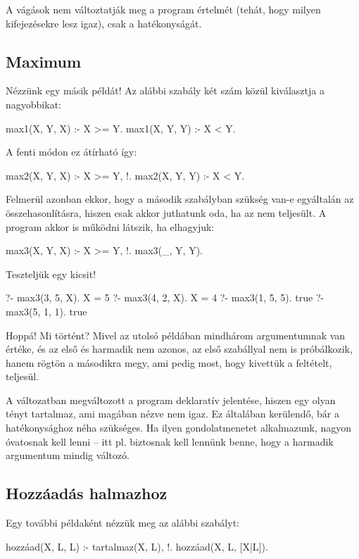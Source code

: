 A vágások nem változtatják meg a program értelmét
(tehát, hogy milyen kifejezésekre lesz igaz), csak a
hatékonyságát.

\subsection*{Maximum}
Nézzünk egy másik példát! Az alábbi szabály két szám
közül kiválasztja a nagyobbikat:
\begin{program}
max1(X, Y, X) :- X >= Y.
max1(X, Y, Y) :- X < Y.
\end{program}
A fenti módon ez átírható így:
\begin{program}
max2(X, Y, X) :- X >= Y, !.
max2(X, Y, Y) :- X < Y.
\end{program}

Felmerül azonban ekkor, hogy a második szabályban szükség
van-e egyáltalán az  összehasonlításra,
hiszen csak akkor juthatunk oda, ha az 
nem teljesült. A program akkor is működni látszik,
ha elhagyjuk:
\begin{program}
max3(X, Y, X) :- X >= Y, !.
max3(_, Y, Y).
\end{program}

Teszteljük egy kicsit!
\begin{query}
?- max3(3, 5, X).
X = 5
?- max3(4, 2, X).
X = 4
?- max3(1, 5, 5).
true
?- max3(5, 1, 1). %
true
\end{query}

Hoppá! Mi történt?  Mivel az utolsó példában
mindhárom argumentumnak van értéke, és az első és
harmadik nem azonos, az első szabállyal nem is
próbálkozik, hanem rögtön a másodikra megy, ami
pedig most, hogy kivettük a feltételt, teljesül.

A  változatban megváltozott a program
deklaratív jelentése, hiszen egy olyan tényt
tartalmaz, ami magában nézve nem igaz. Ez általában
kerülendő, bár a hatékonysághoz néha szükséges. Ha
ilyen gondolatmenetet alkalmazunk, nagyon óvatosnak
kell lenni -- itt pl. biztosnak kell lennünk benne,
hogy a harmadik argumentum mindig változó.

\subsection*{Hozzáadás halmazhoz}
Egy további példaként nézzük meg az alábbi szabályt:

\begin{program}
hozzáad(X, L, L) :- tartalmaz(X, L), !.
hozzáad(X, L, [X|L]).
\end{program}


